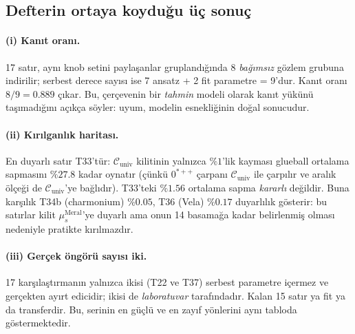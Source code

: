 \documentclass[12pt,a4paper]{article}
\begin{document}
\subsection{Defterin ortaya koyduğu üç sonuç}
\paragraph{(i) Kanıt oranı.} 17 satır, aynı knob setini paylaşanlar gruplandığında
8 \emph{bağımsız} gözlem grubuna indirilir; serbest derece sayısı ise
7 ansatz + 2 fit parametre = 9'dur. Kanıt oranı $8/9 = 0.889$ çıkar.
Bu, çerçevenin bir \emph{tahmin} modeli olarak kanıt yükünü taşımadığını
açıkça söyler: uyum, modelin esnekliğinin doğal sonucudur.
\paragraph{(ii) Kırılganlık haritası.} En duyarlı satır T33'tür: $\mathcal{C}_{\mathrm{univ}}$
kilitinin yalnızca $\%1$'lik kayması glueball ortalama sapmasını
$\%27.8$ kadar oynatır (çünkü $0^{*++}$ çarpanı $\mathcal{C}_{\mathrm{univ}}$ ile
çarpılır ve aralık ölçeği de $\mathcal{C}_{\mathrm{univ}}$'ye bağlıdır). T33'teki
$\%1.56$ ortalama sapma \emph{kararlı} değildir. Buna karşılık T34b
(charmonium) $\%0.05$, T36 (Vela) $\%0.17$ duyarlılık gösterir: bu satırlar
kilit $\mu_s^{\mathrm{Meral}}$'ye duyarlı ama onun 14 basamağa kadar
belirlenmiş olması nedeniyle pratikte kırılmazdır.
\paragraph{(iii) Gerçek öngörü sayısı iki.} 17 karşılaştırmanın yalnızca
ikisi (T22 ve T37) serbest parametre içermez ve gerçekten ayırt edicidir;
ikisi de \emph{laboratuvar} tarafındadır. Kalan 15 satır ya fit ya da
transferdir. Bu, serinin en güçlü ve en zayıf yönlerini aynı tabloda
göstermektedir.
\end{document}
